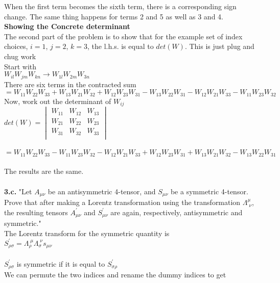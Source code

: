 \documentclass[prb,preprint]
{revtex4-1}
\newcommand{\PRLsep}{\noindent\makebox[\linewidth]{\resizebox{0.8888\linewidth}{2pt}{$\bullet$}}\bigskip}
\begin{document}
When the first term becomes the sixth term, there is a corresponding sign change.  The same thing happens for terms 2 and 5 as well as 3 and 4.
\\

{\bf Showing the Concrete determinant}\\

The second part of the problem is to show that for the example set of index choices, $i = 1$, $j = 2$, $k = 3$, the l.h.s. is equal to $det\left(W\right)$.  This is just plug and chug work\\
Start with\\
$W_{il}W_{jm}W_{kn} \rightarrow W_{1l}W_{2m}W_{3n}$\\
There are six terms in the contracted sum\\
$= W_{11}W_{22}W_{33} + W_{13}W_{21}W_{32} + W_{12}W_{23}W_{31} - W_{13}W_{22}W_{31} - W_{12}W_{21}W_{33} - W_{11}W_{23}W_{32}$
\\
Now, work out the determinant of $W_{ij}$
\\
$det\left(W\right) = \begin{vmatrix}
W_{11} & W_{12} & W_{13}\\
W_{21} & W_{22} & W_{23}\\
W_{31} & W_{32} & W_{33}\\
\end{vmatrix}$\\\\
$=W_{11}W_{22}W_{33} - W_{11}W_{23}W_{32} - W_{12}W_{21}W_{33} + W_{12}W_{23}W_{31} + W_{13}W_{21}W_{32} - W_{13}W_{22}W_{31}$\\\\
The results are the same.
\\
\PRLsep
\\
{\bf 3.c.}  "Let $A_{\mu\nu}$ be an antisymmetric 4-tensor, and $S_{\mu\nu}$ be a symmetric 4-tensor. Prove that after making a Lorentz transformation using the transformation $\Lambda^\mu_{\;\nu}$, the resulting tensors $A^\prime_{\mu\nu}$ and $S^\prime_{\mu\nu}$ are again, respectively, antisymmetric and symmetric."
\\
The Lorentz transform for the symmetric quantity is 
\\
$S^\prime_{\rho\sigma} = \Lambda_\rho^{\;\mu}\Lambda_\sigma^{\;\nu}s_{\mu\nu}$
\\
\\
$S^\prime_{\rho\sigma}$ is symmetric if it is equal to $S^\prime_{\sigma\rho}$
\\
We can permute the two indices and rename the dummy indices to get
\end{document}

